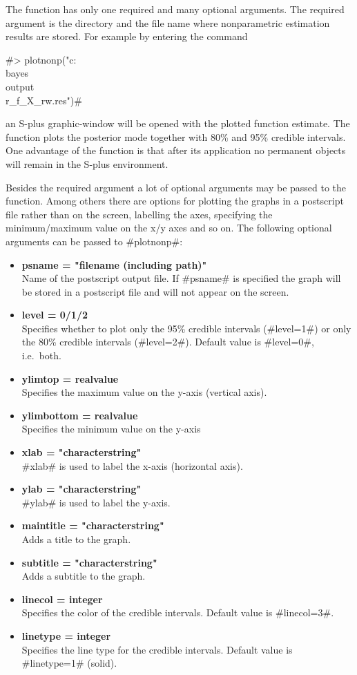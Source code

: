 The function has only one required and many optional arguments.
The required argument is the directory and the file name where
nonparametric estimation results are stored. For example by
entering the command

#> plotnonp("c:\\bayes\\output\\r_f_X_rw.res")#

an S-plus graphic-window will be opened with the plotted function
estimate. The function plots the posterior mode together with 80\%
and 95\% credible intervals. One advantage of the function is that
after its application no permanent objects will remain in the
S-plus environment.

Besides the required argument a lot of optional arguments may be
passed to the function. Among others there are options for
plotting the graphs in a postscript file rather than on the
screen, labelling the axes, specifying the minimum/maximum value
on the x/y axes and so on. The following optional arguments can be
passed to #plotnonp#:

\begin{itemize}
\item {\bf psname = "filename (including path)"}\\
Name of the postscript output file. If #psname# is specified the
graph will be stored in a postscript file and will not appear on
the screen.
\item {\bf level = 0/1/2} \\
Specifies whether to plot only the 95\% credible intervals
(#level=1#) or only the 80\% credible intervals (#level=2#).
Default value is #level=0#, i.e.~both.
\item {\bf ylimtop = realvalue} \\
Specifies the maximum value on the y-axis (vertical axis).
\item {\bf ylimbottom = realvalue}\\
Specifies the minimum value on the y-axis
\item {\bf xlab = "characterstring"} \\
#xlab# is used to label the x-axis (horizontal axis).
\item {\bf ylab = "characterstring"} \\
#ylab# is used to label the y-axis.
\item {\bf maintitle = "characterstring"} \\
Adds a title to the graph.
\item {\bf subtitle = "characterstring"} \\
Adds a subtitle to the graph.
\item {\bf linecol = integer} \\
Specifies the color of the credible intervals. Default value is
#linecol=3#.
\item {\bf linetype = integer} \\
Specifies the line type for the credible intervals. Default value
is #linetype=1# (solid).
\end{itemize}

